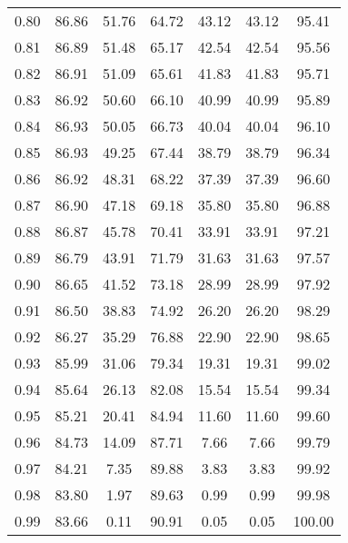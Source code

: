 \begin{tabular}{|c|c|c|c|c|c|c|}
      0.80 &     86.86 &     51.76 &      64.72 &   43.12 &      43.12 &         95.41 \\
      0.81 &     86.89 &     51.48 &      65.17 &   42.54 &      42.54 &         95.56 \\
      0.82 &     86.91 &     51.09 &      65.61 &   41.83 &      41.83 &         95.71 \\
      0.83 &     86.92 &     50.60 &      66.10 &   40.99 &      40.99 &         95.89 \\
      0.84 &     86.93 &     50.05 &      66.73 &   40.04 &      40.04 &         96.10 \\
      0.85 &     86.93 &     49.25 &      67.44 &   38.79 &      38.79 &         96.34 \\
      0.86 &     86.92 &     48.31 &      68.22 &   37.39 &      37.39 &         96.60 \\
      0.87 &     86.90 &     47.18 &      69.18 &   35.80 &      35.80 &         96.88 \\
      0.88 &     86.87 &     45.78 &      70.41 &   33.91 &      33.91 &         97.21 \\
      0.89 &     86.79 &     43.91 &      71.79 &   31.63 &      31.63 &         97.57 \\
      0.90 &     86.65 &     41.52 &      73.18 &   28.99 &      28.99 &         97.92 \\
      0.91 &     86.50 &     38.83 &      74.92 &   26.20 &      26.20 &         98.29 \\
      0.92 &     86.27 &     35.29 &      76.88 &   22.90 &      22.90 &         98.65 \\
      0.93 &     85.99 &     31.06 &      79.34 &   19.31 &      19.31 &         99.02 \\
      0.94 &     85.64 &     26.13 &      82.08 &   15.54 &      15.54 &         99.34 \\
      0.95 &     85.21 &     20.41 &      84.94 &   11.60 &      11.60 &         99.60 \\
      0.96 &     84.73 &     14.09 &      87.71 &    7.66 &       7.66 &         99.79 \\
      0.97 &     84.21 &      7.35 &      89.88 &    3.83 &       3.83 &         99.92 \\
      0.98 &     83.80 &      1.97 &      89.63 &    0.99 &       0.99 &         99.98 \\
      0.99 &     83.66 &      0.11 &      90.91 &    0.05 &       0.05 &        100.00 \\
\bottomrule
\end{tabular}
